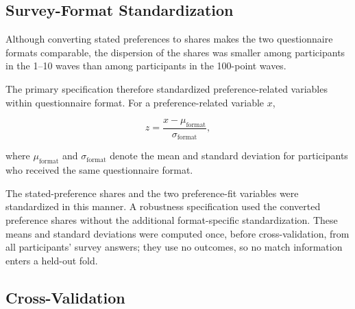 
\subsection{Survey-Format Standardization}

Although converting stated preferences to shares makes the two questionnaire formats comparable, the dispersion of the shares was smaller among participants in the 1--10 waves than among participants in the 100-point waves.

The primary specification therefore standardized preference-related variables within questionnaire format. For a preference-related variable $x$,

\begin{equation}
z
=
\frac{
x-\mu_{\text{format}}
}{
\sigma_{\text{format}}
},
\end{equation}

where $\mu_{\text{format}}$ and $\sigma_{\text{format}}$ denote the mean and standard deviation for participants who received the same questionnaire format.

The stated-preference shares and the two preference-fit variables were standardized in this manner. A robustness specification used the converted preference shares without the additional format-specific standardization.
These means and standard deviations were computed once, before cross-validation, from all participants' survey answers; they use no outcomes, so no match information enters a held-out fold.

\subsection{Cross-Validation}

